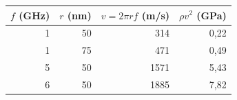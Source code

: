 \begin{tabular}{rrrr}
\hline
$f$ (GHz) & $r$ (nm) & $v=2\pi r f$ (m/s) & $\rho v^2$ (GPa) \\
\hline
1 & 50 & 314 & 0{,}22 \\
1 & 75 & 471 & 0{,}49 \\
5 & 50 & 1571 & 5{,}43 \\
6 & 50 & 1885 & 7{,}82 \\
\hline
\end{tabular}
